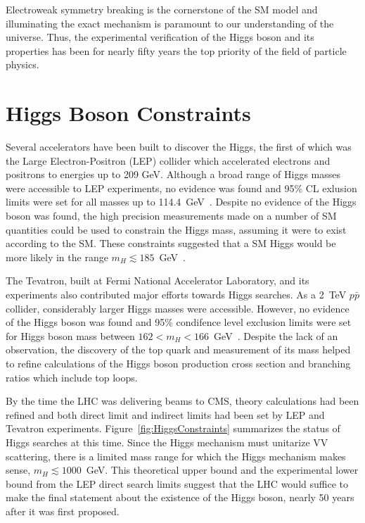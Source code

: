 Electroweak symmetry breaking is the cornerstone of the SM model and 
illuminating the exact mechanism is paramount to our 
understanding of the universe.  Thus, the experimental verification
of the Higgs boson and its properties has been for nearly
fifty years the top priority of the field of particle physics.   

\section{Higgs Boson Constraints}
\label{sec:The Higgs boson}

Several accelerators have been built to discover the Higgs, 
the first of which was the Large Electron-Positron (LEP) collider
which accelerated electrons and positrons to energies up to 209 GeV.
Although a broad range of Higgs masses 
were accessible to LEP experiments, no evidence was found and 
95\% CL exlusion limits were set for all masses up to 114.4~GeV~\cite{Barate:2003sz}.
Despite no evidence of the Higgs boson was 
found, the high precision measurements made on a number of SM 
quantities could be used to constrain the Higgs mass, assuming it 
were to exist according to the SM.  These constraints suggested 
that a SM Higgs would be more likely in the range $m_H\lesssim185$~GeV~\cite{Group:2008aa}.  

The Tevatron, built at Fermi National Accelerator Laboratory, 
and its experiments also contributed major efforts towards Higgs
searches.  As a 2~TeV $p\bar{p}$ collider, considerably larger 
Higgs masses were accessible.  However, no evidence of the 
Higgs boson  was found and 95\% condifence level exclusion limits
were set for Higgs boson mass between
$162<m_H<166$~GeV~\cite{Aaltonen:2010yv}.  
Despite the lack of an observation, the discovery of the
top quark and measurement of its mass helped
to refine calculations of the Higgs boson production cross section and 
branching ratios which include top loops.  

By the time the LHC was delivering beams to CMS, theory
calculations had been refined and both direct limit and indirect
limits had been set by LEP and Tevatron experiments.
Figure~\ref{fig:HiggsConstraints} summarizes the 
status of Higgs searches at this time.  Since the Higgs mechanism
must unitarize VV scattering, there is a limited mass range for 
which the Higgs mechanism makes sense, $m_H\lesssim1000$~GeV. This theoretical
upper bound and the experimental lower bound from the LEP direct
search limits suggest that the LHC would suffice to make the final
statement about the existence of the Higgs boson, nearly 50 
years after it was first proposed.  

